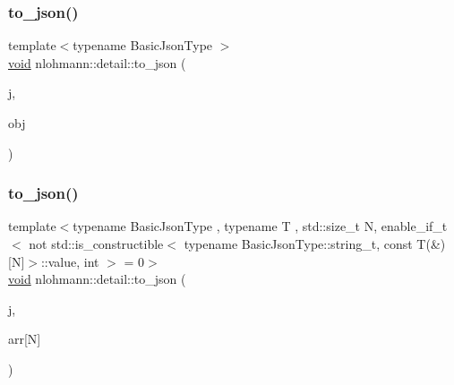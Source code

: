 \mbox{\label{namespacenlohmann_1_1detail_ac9f7a5542851c61d93740148eaec509f}} 
\subsubsection{\texorpdfstring{to\+\_\+json()}{to\_json()}\hspace{0.1cm}{\footnotesize\ttfamily [13/17]}}
{\footnotesize\ttfamily template$<$typename Basic\+Json\+Type $>$ \\
\hyperlink{namespacenlohmann_1_1detail_a59fca69799f6b9e366710cb9043aa77d}{void} nlohmann\+::detail\+::to\+\_\+json (\begin{DoxyParamCaption}\item[{Basic\+Json\+Type \&}]{j,  }\item[{typename Basic\+Json\+Type\+::object\+\_\+t \&\&}]{obj }\end{DoxyParamCaption})}

\mbox{\label{namespacenlohmann_1_1detail_a20ea5175c8999fc8b673e46b892f71f6}} 
\subsubsection{\texorpdfstring{to\+\_\+json()}{to\_json()}\hspace{0.1cm}{\footnotesize\ttfamily [14/17]}}
{\footnotesize\ttfamily template$<$typename Basic\+Json\+Type , typename T , std\+::size\+\_\+t N, enable\+\_\+if\+\_\+t$<$ not std\+::is\+\_\+constructible$<$ typename Basic\+Json\+Type\+::string\+\_\+t, const T(\&)\mbox{[}\+N\mbox{]}$>$\+::value, int $>$  = 0$>$ \\
\hyperlink{namespacenlohmann_1_1detail_a59fca69799f6b9e366710cb9043aa77d}{void} nlohmann\+::detail\+::to\+\_\+json (\begin{DoxyParamCaption}\item[{Basic\+Json\+Type \&}]{j,  }\item[{const T(\&)}]{arr\mbox{[}\+N\mbox{]} }\end{DoxyParamCaption})}

\mbox{\label{namespacenlohmann_1_1detail_aa30611f74062379d3420c40487cf3bb3}} 
